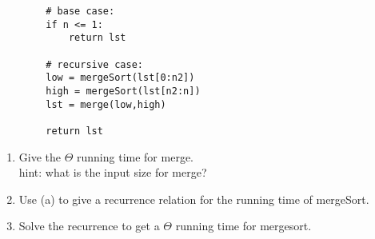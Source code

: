 \documentclass[basic, header]{nosvagor-notes}
\begin{document}
\begin{enumerate}[itemsep=4em]
\begin{multicols}{2}
\begin{verbatim}
        # base case:
        if n <= 1:
            return lst

        # recursive case:
        low = mergeSort(lst[0:n2])
        high = mergeSort(lst[n2:n])
        lst = merge(low,high)

        return lst
      \end{verbatim}
    \end{multicols}

  \begin{enumerate}[itemsep=4em]
    \item Give the $\Theta$ running time for merge.\\
      hint: what is the input size for merge?
    \item Use (a) to give a recurrence relation for the running time of mergeSort.
    \item Solve the recurrence to get a $\Theta$ running time for mergesort.
  \end{enumerate}

\end{enumerate}
\end{document}
